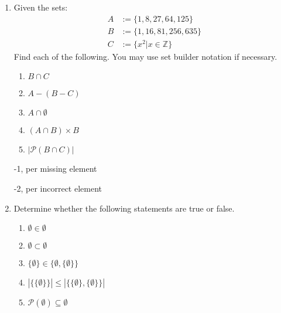 \begin{enumerate}


















    
\item Given the sets: 
\begin{align*}
    A &:= \{1,8,27,64,125\}\\
    B &:= \{1,16,81,256,635\}\\
    C &:= \{x^2 | x \in \mathbb{Z}\}\
\end{align*}
Find each of the following. You may use set builder notation if necessary.
\pte 5

\begin{enumerate}
    \item $B \cap C$
    \item $A-(B-C)$
    \item $A \cap \emptyset$
    \item $(A \cap B) \times B$
    \item $|\mathcal{P}(B\cap C)|$
\end{enumerate}

\begin{rubric}
-1, per missing element

-2, per incorrect element

\end{rubric}

\item Determine whether the following statements are true or false. 

\begin{enumerate}
    \item $\emptyset \in \emptyset$
    \item $\emptyset \subset \emptyset$
    \item $\{\emptyset\} \in \{\emptyset,\{\emptyset\}\}$
    \item $|\{\{\emptyset\}\}| \leq |\{\{\emptyset\}, \{\emptyset\}\}|$
    \item $\mathcal{P}(\emptyset) \subseteq \emptyset$
\end{enumerate}


\end{enumerate}
